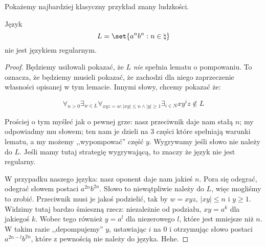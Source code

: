 Pokażemy najbardziej klasyczny przykład znany ludzkości. 

\begin{theorem}
    Język
    \[
        L = \set{a^nb^n : n \in \natural}
    \]
    nie jest językiem regularnym.
\end{theorem}

\begin{proof}
    Będziemy usiłowali pokazać, że \(L\) \textit{nie} spełnia lematu o pompowaniu. To oznacza, że będziemy musieli pokazać, że zachodzi dla niego zaprzeczenie własności opisanej w tym lemacie. Innymi słowy, chcemy pokazać że:
    
    \[
        \forall_{n>0} \exists_{w \in L} \forall_{xyz=w : |xy| \leq n \land |y| \geq 1} \exists_{i \in N} xy^iz \not \in L 
    \]
    
    Prościej o tym myśleć jak o pewnej grze: nasz przeciwnik daje nam stałą \(n\); my odpowiadmy mu słowem; ten nam je dzieli na 3 części które spełniają warunki lematu, a my możemy ,,wypompować'' część \(y\). Wygrywamy jeśli słowo nie należy do \(L\). Jeśli mamy tutaj strategię wygrywającą, to znaczy że język nie jest regularny. 
    
    W przypadku naszego języka: nasz oponent daje nam jakieś \(n\). Pora się odegrać, odegrać słowem postaci \(a^{2n}b^{2n}\). Słowo to niewątpliwie należy do \(L\), więc mogliśmy to zrobić. Przeciwnik musi je jakoś podzielić, tak by \( w = xyz\), \(|xy| \leq n \) i \(y \geq 1\). Widzimy tutaj bardzo śmieszną rzecz: niezależnie od podziału, \(xy = a^k\) dla jakiegoś \(k\). Wobec tego również \(y = a^l\) dla niezerowego \(l\), które jest mniejsze niż \(n\). W takim razie ,,depompujemy'' \(y\), ustawiając \(i\) na 0 i otrzymując słowo postaci \(a^{2n-l}b^{2n}\), które z pewnością nie należy do języka. Hehe. 
\end{proof}